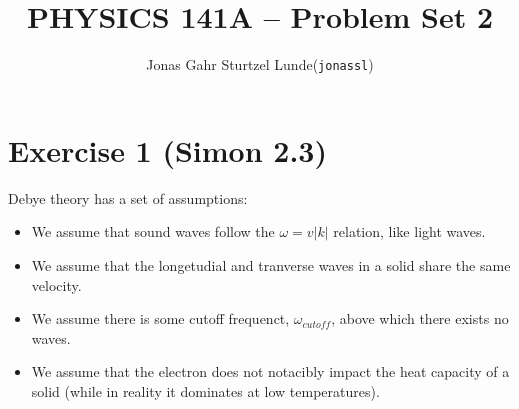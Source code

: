 \documentclass[12p,a4paper]{article}
\begin{document}
\title{PHYSICS 141A -- Problem Set 2}
\author{
    \begin{tabular}{r l}
        Jonas Gahr Sturtzel Lunde & (\texttt{jonassl})
    \end{tabular}}

\maketitle

\hspace{10cm}

\section*{Exercise 1 (Simon 2.3)}
Debye theory has a set of assumptions:
\begin{itemize}
    \item We assume that sound waves follow the $\omega = v|k|$ relation, like light waves.
    \item We assume that the longetudial and tranverse waves in a solid share the same velocity.
    \item We assume there is some cutoff frequenct, $\omega_{cutoff}$, above which there exists no waves.
    \item We assume that the electron does not notacibly impact the heat capacity of a solid (while in reality it dominates at low temperatures).
\end{itemize}
\end{document}
